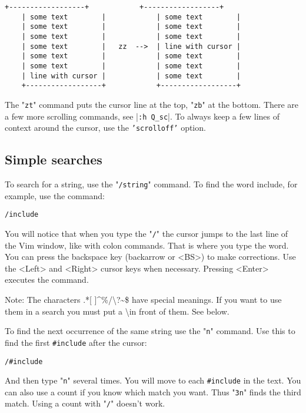 \begin{Verbatim}[samepage=true]
    +------------------+            +------------------+
    | some text        |            | some text        |
    | some text        |            | some text        |
    | some text        |            | some text        |
    | some text        |   zz  -->  | line with cursor |
    | some text        |            | some text        |
    | some text        |            | some text        |
    | line with cursor |            | some text        |
    +------------------+            +------------------+
\end{Verbatim}

The "\texttt{zt}" command puts the cursor line at the top, "\texttt{zb}" at the bottom.
There are a few more scrolling commands, see |\texttt{:h Q\_sc}|.
To always keep a few lines of context around the cursor, use the \texttt{'scrolloff'} option.

\subsection{Simple searches}

To search for a string, use the "\texttt{/string}" command.
To find the word include, for example, use the command:

 \begin{Verbatim}[samepage=true]
 /include
 \end{Verbatim}

You will notice that when you type the "\texttt{/}" the cursor jumps to the last line of the Vim window, like with colon commands.
That is where you type the word.
You can press the backspace key (backarrow or <BS>) to make corrections.
Use the <Left> and <Right> cursor keys when necessary.
Pressing <Enter> executes the command.

Note:
The characters .*[ ]\textasciicircum\%/\textbackslash?\textasciitilde\$ have special meanings.
If you want to use them in a search you must put a \textbackslash in front of them.
See below.

To find the next occurrence of the same string use the "\texttt{n}" command.
Use this to find the first \texttt{\#include} after the cursor:

 \begin{Verbatim}[samepage=true]
 /#include
 \end{Verbatim}

And then type "\texttt{n}" several times.
You will move to each \texttt{\#include} in the text.
You can also use a count if you know which match you want.
Thus "\texttt{3n}" finds the third match.
Using a count with "\texttt{/}" doesn't work.

